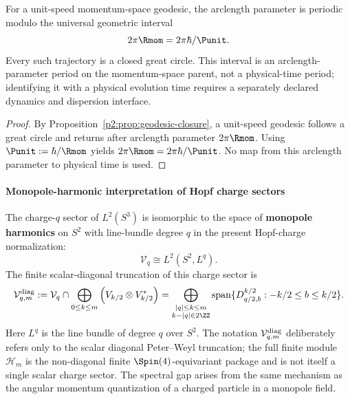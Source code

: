 \documentclass[11pt,a4paper]{article}
\begin{document}
\begin{corollary}
\label{p2:cor:momentum-space-geodesic-periodicity}
For a unit-speed momentum-space geodesic, the arclength parameter is periodic
modulo the universal geometric interval
\[
2\pi \Rmom = 2\pi\hbar/\Punit.
\]
Every such trajectory is a closed great circle.  This interval is an
arclength-parameter period on the momentum-space parent, not a physical-time
period; identifying it with a physical evolution time requires a separately
declared dynamics and dispersion interface.
\end{corollary}

\begin{proof}
By Proposition~\ref{p2:prop:geodesic-closure}, a unit-speed geodesic follows a
great circle and returns after arclength parameter \(2\pi\Rmom\).  Using
\(\Punit:=\hbar/\Rmom\) yields
\(2\pi\Rmom=2\pi\hbar/\Punit\).  No map from this arclength parameter to
physical time is used.
\end{proof}





\paragraph{Monopole-harmonic interpretation of Hopf charge sectors}

\begin{proposition}
\label{p2:prop:monopole}
The charge-$q$ sector of $L^2(S^3)$ is isomorphic to the space of \textbf{monopole harmonics} on $S^2$ with line-bundle degree $q$ in the present Hopf-charge normalization:
\begin{equation}
\mathcal V_q \cong L^2(S^2, L^q).
\end{equation}
The finite scalar-diagonal truncation of this charge sector is
\begin{equation}
\label{p2:eq:scalar-diagonal-charge-truncation}
\mathcal V^{\rm diag}_{q,m}
:=
\mathcal V_q\cap
\bigoplus_{0\le k\le m}\left(V_{k/2}\otimes V_{k/2}^*\right)
=
\bigoplus_{\substack{|q|\le k\le m\\ k-|q|\in2\ZZ}}
\operatorname{span}\{D^{k/2}_{q/2,b}:-k/2\le b\le k/2\}.
\end{equation}
Here $L^q$ is the line bundle of degree $q$ over $S^2$.  The notation
\(\mathcal V^{\rm diag}_{q,m}\) deliberately refers only to the scalar diagonal
Peter--Weyl truncation; the full finite module $\mathcal H_m$ is the non-diagonal
finite \(\Spin(4)\)-equivariant package and is not itself a single scalar charge
sector. The spectral gap arises from the same mechanism as the angular momentum quantization of a charged particle in a monopole field.
\end{proposition}
\end{document}
